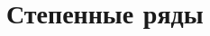 \documentclass[../main.tex]{subfiles}
\begin{document}
 \chapter{Степенные ряды}
 
 
\end{document}
